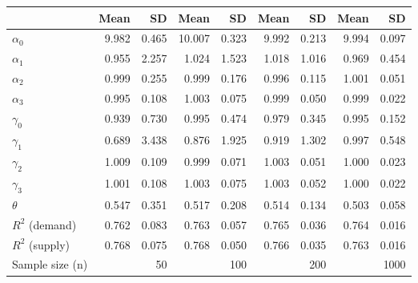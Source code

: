 
\begin{tabular}[t]{lrrrrrrrr}
\toprule
  & Mean & SD & Mean  & SD  & Mean   & SD   & Mean    & SD   \\
\midrule
$\alpha_{0}$ & 9.982 & 0.465 & 10.007 & 0.323 & 9.992 & 0.213 & 9.994 & 0.097\\
$\alpha_{1}$ & 0.955 & 2.257 & 1.024 & 1.523 & 1.018 & 1.016 & 0.969 & 0.454\\
$\alpha_{2}$ & 0.999 & 0.255 & 0.999 & 0.176 & 0.996 & 0.115 & 1.001 & 0.051\\
$\alpha_{3}$ & 0.995 & 0.108 & 1.003 & 0.075 & 0.999 & 0.050 & 0.999 & 0.022\\
$\gamma_{0}$ & 0.939 & 0.730 & 0.995 & 0.474 & 0.979 & 0.345 & 0.995 & 0.152\\
$\gamma_{1}$ & 0.689 & 3.438 & 0.876 & 1.925 & 0.919 & 1.302 & 0.997 & 0.548\\
$\gamma_{2}$ & 1.009 & 0.109 & 0.999 & 0.071 & 1.003 & 0.051 & 1.000 & 0.023\\
$\gamma_{3}$ & 1.001 & 0.108 & 1.003 & 0.075 & 1.003 & 0.052 & 1.000 & 0.022\\
$\theta$ & 0.547 & 0.351 & 0.517 & 0.208 & 0.514 & 0.134 & 0.503 & 0.058\\
$R^{2}$ (demand) & 0.762 & 0.083 & 0.763 & 0.057 & 0.765 & 0.036 & 0.764 & 0.016\\
$R^{2}$ (supply) & 0.768 & 0.075 & 0.768 & 0.050 & 0.766 & 0.035 & 0.763 & 0.016\\
Sample size (n) &  & 50 &  & 100 &  & 200 &  & 1000\\
\bottomrule
\end{tabular}
